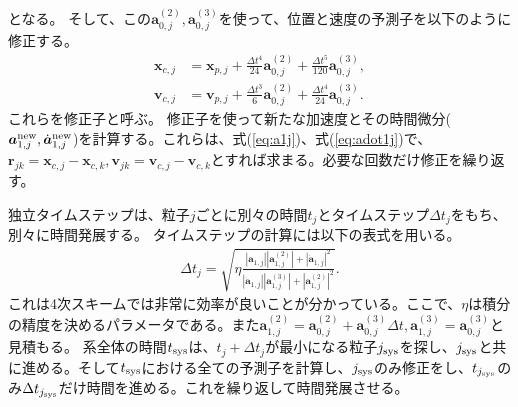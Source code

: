 \documentclass[a4paper,10pt,oneside,twocolumn,notitlepage,final]{jarticle}
\begin{document}
となる。
そして、この${\bm a}_{0,j}^{(2)},{\bm a}_{0,j}^{(3)}$を使って、位置と速度の予測子を以下のように修正する。
\begin{align}
{\bm x}_{c,j} &= {\bm x}_{p,j} + \frac{\Delta t ^4}{24} {\bm a}_{0,j}^{(2)} + \frac{\Delta t ^5}{120} {\bm a}_{0,j}^{(3)},\\
{\bm v}_{c,j} &= {\bm v}_{p,j} + \frac{\Delta t ^3}{6} {\bm a}_{0,j}^{(2)} + \frac{\Delta t ^4}{24} {\bm a}_{0,j}^{(3)}.
\end{align}
これらを修正子と呼ぶ。
修正子を使って新たな加速度とその時間微分(${\bm a}_{1,j}^{\rm new},\dot{{\bm a}}_{1,j}^{\rm new}$)を計算する。これらは、式(\ref{eq:a1j})、式(\ref{eq:adot1j})で、${\bm r}_{jk} = {\bm x}_{c,j} - {\bm x}_{c,k},{\bm v}_{jk} = {\bm v}_{c,j} - {\bm v}_{c,k}$とすれば求まる。必要な回数だけ修正を繰り返す。

独立タイムステップは、粒子$j$ごとに別々の時間$t_j$とタイムステップ$\Delta t_j$をもち、別々に時間発展する。
タイムステップの計算には以下の表式を用いる\citep{Aarseth1985}。
\begin{align}
\Delta t_j = \sqrt{\eta \frac{| {\bm a}_{1,j}| | {\bm a}_{1,j}^{(2)} | + | \dot{{\bm a}}_{1,j}| ^2}{| \dot{{\bm a}}_{1,j}| | {\bm a}_{1,j}^{(3)} | + | {\bm a}_{1,j}^{(2)} | ^2}}.
\end{align}
これは4次スキームでは非常に効率が良いことが分かっている\citep{Makino1991}。ここで、$\eta$は積分の精度を決めるパラメータである。また${\bm a}_{1,j}^{(2)} = {\bm a}_{0,j}^{(2)} + {\bm a}_{0,j}^{(3)} \Delta t, {\bm a}_{1,j}^{(3)} = {\bm a}_{0,j}^{(3)}$と見積もる。
系全体の時間$t_{\rm sys}$は、$t_j + \Delta t_j$が最小になる粒子$j_{\rm sys}$を探し、$j_{\rm sys}$と共に進める。そして$t_{\rm sys}$における全ての予測子を計算し、$j_{\rm sys}$のみ修正をし、$t_{j_{\rm sys}}$のみ$\Delta t_{j_{\rm sys}}$だけ時間を進める。これを繰り返して時間発展させる。
\end{document}
